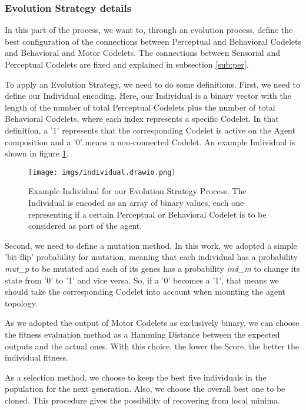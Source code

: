 \subsubsection{Evolution Strategy details}

In this part of the process, we want to, through an evolution process, define the best configuration of the connections between Perceptual and Behavioral Codelets and Behavioral and Motor Codelets. The connections between Sensorial and Perceptual Codelets are fixed and explained in subsection \ref{sub:per}.

To apply an Evolution Strategy, we need to do some definitions. First, we need to define our Individual encoding. Here, our Individual is a binary vector with the length of the number of total Perceptual Codelets plus the number of total Behavioral Codelets, where each index represents a specific Codelet. In that definition, a '1' represents that the corresponding Codelet is active on the Agent composition and a '0' means a non-connected Codelet. An example Individual is shown in figure \ref{fig:individual}.

\begin{figure}[hb]
\centering
	\texttt{[image: imgs/individual.drawio.png]}
\caption{Example Individual for our Evolution Strategy Process. The Individual is encoded as an array of binary values, each one representing if a certain Perceptual or Behavioral Codelet is to be considered as part of the agent.}
\label{fig:individual}
\end{figure}

Second, we need to define a mutation method. In this work, we adopted a simple 'bit-flip' probability for mutation, meaning that each individual has a probability \emph{mut\_p} to be mutated and each of its genes has a probability \emph{ind\_m} to change its state from '0' to '1' and vice versa. So, if a '0' becomes a '1', that means we should take the corresponding Codelet into account when mounting the agent topology.

As we adopted the output of Motor Codelets as exclusively binary, we can choose the fitness evaluation method as a Hamming Distance between the expected outputs and the actual ones. With this choice, the lower the Score, the better the individual fitness.

As a selection method, we choose to keep the best five individuals in the population for the next generation. Also, we choose the overall best one to be cloned. This procedure gives the possibility of recovering from local minima.

